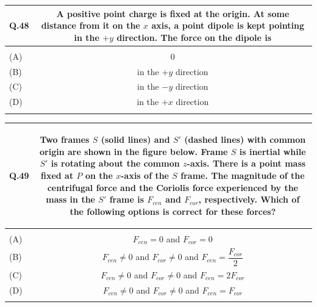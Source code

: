 \documentclass[12pt,a4paper]{article}
\begin{document}
\vspace{0.4cm}

\begin{table}[h!]
\begin{tabular}{|L|C|}
\hline
Q.48 &
A positive point charge is fixed at the origin. At some distance from it on the $x$ axis,
a point dipole is kept pointing in the $+y$ direction. The force on the dipole is \\
\hline
 & \\
\hline
(A) & $0$ \\
\hline
(B) & in the $+y$ direction \\
\hline
(C) & in the $-y$ direction \\
\hline
(D) & in the $+x$ direction \\
\hline
 & \\
\hline
\end{tabular}
\end{table}

\vspace{0.4cm}

\begin{table}[h!]
\begin{tabular}{|L|C|}
\hline
Q.49 &
Two frames $S$ (solid lines) and $S'$ (dashed lines) with common origin are shown in the
figure below. Frame $S$ is inertial while $S'$ is rotating about the common $z$-axis.
There is a point mass fixed at $P$ on the $x$-axis of the $S$ frame. The magnitude of
the centrifugal force and the Coriolis force experienced by the mass in the $S'$ frame
is $F_{cen}$ and $F_{cor}$, respectively. Which of the following options is correct for
these forces?

\vspace{0.3cm}
\begin{center}
\end{center}
\\
\hline
 & \\
\hline
(A) & $F_{cen} = 0$ and $F_{cor} = 0$ \\
\hline
(B) & $F_{cen} \neq 0$ and $F_{cor} \neq 0$ and $F_{cen} = \dfrac{F_{cor}}{2}$ \\
\hline
(C) & $F_{cen} \neq 0$ and $F_{cor} \neq 0$ and $F_{cen} = 2F_{cor}$ \\
\hline
(D) & $F_{cen} \neq 0$ and $F_{cor} \neq 0$ and $F_{cen} = F_{cor}$ \\
\hline
 & \\
\hline
\end{tabular}
\end{table}
\end{document}
